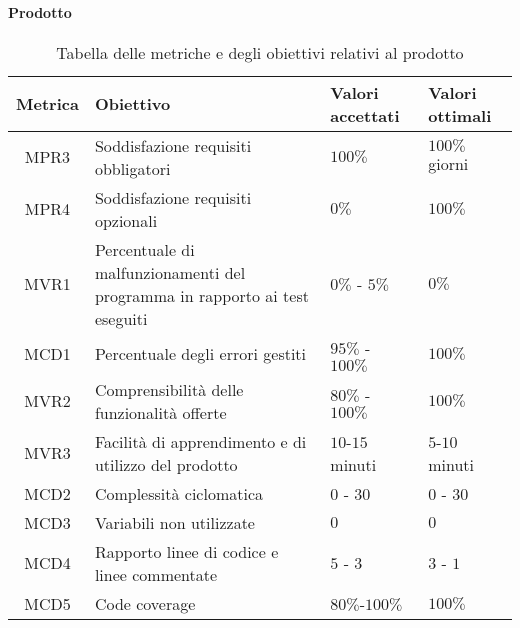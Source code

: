 \paragraph{Prodotto}
\begin{table}[H]
		\begin{center}
			\setlength{\aboverulesep}{0pt}
			\setlength{\belowrulesep}{0pt}
			\setlength{\extrarowheight}{.75ex}
			\begin{tabular}{ c C{6cm} C{3cm} C{3cm} }
				\textbf{Metrica} & \textbf{Obiettivo} & \textbf{Valori accettati} & \textbf{Valori ottimali}  \\
				\toprule
				MPR3 & Soddisfazione requisiti obbligatori & $100 \%$ & $100 \%$ giorni \\
				MPR4 & Soddisfazione requisiti opzionali & $ 0 \%$ & $ 100\%$ \\
				MVR1 & Percentuale di malfunzionamenti del programma in rapporto ai test eseguiti & $ 0\%$ - $5\%$  & $0\%$ \\
				MCD1 & Percentuale degli errori gestiti & $ 95\%$ - $100\% $ & $100\%$ \\
				MVR2 & Comprensibilità delle funzionalità offerte & $ 80\%$ - $100\% $ & $100\%$ \\
				MVR3 & Facilità di apprendimento e di utilizzo del prodotto & $10$-$15$ minuti & $5$-$10$ minuti \\
				MCD2 & Complessità ciclomatica & $0$ - $30$ & $0$ - $30$ \\
				MCD3 & Variabili non utilizzate & $0$ & $0$ \\
				MCD4 & Rapporto linee di codice e linee commentate & $5$ - $3$ & $3$ - $1$\\
				MCD5 & Code coverage & $80\%$-$100\%$ & $100\%$ \\
				\bottomrule
			\end{tabular}
			\caption{Tabella delle metriche e degli obiettivi relativi al prodotto}
		\end{center}
	\end{table}